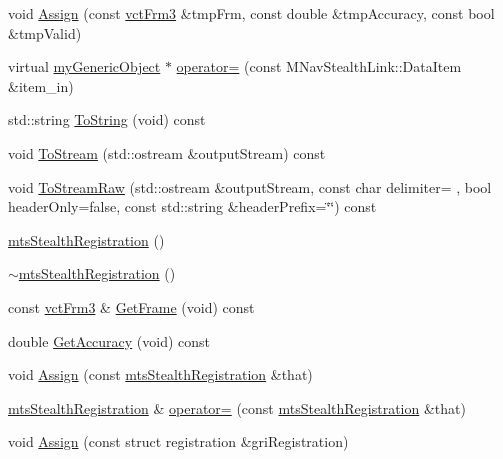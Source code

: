 \begin{DoxyCompactItemize}
\item 
void \hyperlink{classmts_stealth_registration_add68c38da3f107b0a49ed3995b817612}{Assign} (const \hyperlink{vct_transformation_types_8h_a81feda0a02c2d1bc26e5553f409fed20}{vct\+Frm3} \&tmp\+Frm, const double \&tmp\+Accuracy, const bool \&tmp\+Valid)
\item 
virtual \hyperlink{classmy_generic_object}{my\+Generic\+Object} $\ast$ \hyperlink{classmts_stealth_registration_ad01cf3526c41f762655e3898a0751661}{operator=} (const M\+Nav\+Stealth\+Link\+::\+Data\+Item \&item\+\_\+in)
\item 
std\+::string \hyperlink{classmts_stealth_registration_a215e104863a987ea4253519864c2b65d}{To\+String} (void) const 
\item 
void \hyperlink{classmts_stealth_registration_adba3ddfdec70f8ff3212e2cd540cbcf8}{To\+Stream} (std\+::ostream \&output\+Stream) const 
\item 
void \hyperlink{classmts_stealth_registration_acd36e1ba84f6168e0b5151048765888c}{To\+Stream\+Raw} (std\+::ostream \&output\+Stream, const char delimiter= \textquotesingle{} \textquotesingle{}, bool header\+Only=false, const std\+::string \&header\+Prefix=\char`\"{}\char`\"{}) const 
\item 
\hyperlink{classmts_stealth_registration_a81080c46af0e98d66301faf0d50df7a9}{mts\+Stealth\+Registration} ()
\item 
\hyperlink{classmts_stealth_registration_aa67f68f1a4b561db0048bfefc8390809}{$\sim$mts\+Stealth\+Registration} ()
\item 
const \hyperlink{vct_transformation_types_8h_a81feda0a02c2d1bc26e5553f409fed20}{vct\+Frm3} \& \hyperlink{classmts_stealth_registration_a1fe277744997a3d145d9c6afad0e5efa}{Get\+Frame} (void) const 
\item 
double \hyperlink{classmts_stealth_registration_ab0b636a72eb2f9875dde6e3bb1718588}{Get\+Accuracy} (void) const 
\item 
void \hyperlink{classmts_stealth_registration_af5edb0d59e648c60ebf86059a95c271b}{Assign} (const \hyperlink{classmts_stealth_registration}{mts\+Stealth\+Registration} \&that)
\item 
\hyperlink{classmts_stealth_registration}{mts\+Stealth\+Registration} \& \hyperlink{classmts_stealth_registration_a5b1b6941aa8d5dd181bc3f2228563033}{operator=} (const \hyperlink{classmts_stealth_registration}{mts\+Stealth\+Registration} \&that)
\item 
void \hyperlink{classmts_stealth_registration_af865efe13c402e2d1791bfa7cdcea0a8}{Assign} (const struct registration \&gri\+Registration)

\end{DoxyCompactItemize}
